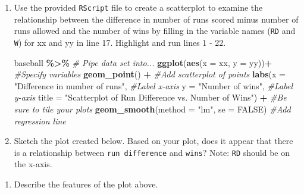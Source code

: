 \documentclass[
]{report}
\newenvironment{Shaded}{\begin{snugshade}}{\end{snugshade}}
\newcommand{\CommentTok}[1]{\textcolor[rgb]{0.56,0.35,0.01}{\textit{#1}}}
\newcommand{\DataTypeTok}[1]{\textcolor[rgb]{0.13,0.29,0.53}{#1}}
\newcommand{\KeywordTok}[1]{\textcolor[rgb]{0.13,0.29,0.53}{\textbf{#1}}}
\newcommand{\NormalTok}[1]{#1}
\newcommand{\OperatorTok}[1]{\textcolor[rgb]{0.81,0.36,0.00}{\textbf{#1}}}
\newcommand{\OtherTok}[1]{\textcolor[rgb]{0.56,0.35,0.01}{#1}}
\newcommand{\StringTok}[1]{\textcolor[rgb]{0.31,0.60,0.02}{#1}}
\providecommand{\tightlist}{%
  \setlength{\itemsep}{0pt}\setlength{\parskip}{0pt}}
\begin{document}
\begin{enumerate}
\def\labelenumi{\arabic{enumi}.}
\setcounter{enumi}{1}
\item
  Use the provided \texttt{RScript} file to create a scatterplot to examine the relationship between the difference in number of runs scored minus number of runs allowed and the number of wins by filling in the variable names (\texttt{RD} and \texttt{W}) for xx and yy in line 17. Highlight and run lines 1 - 22.

\begin{Shaded}
\begin{Highlighting}[]
\NormalTok{baseball }\OperatorTok{\%\textgreater{}\%}\StringTok{ }\CommentTok{\# Pipe data set into...}
\KeywordTok{ggplot}\NormalTok{(}\KeywordTok{aes}\NormalTok{(}\DataTypeTok{x =}\NormalTok{ xx, }\DataTypeTok{y =}\NormalTok{ yy))}\OperatorTok{+}\StringTok{  }\CommentTok{\#Specify variables}
\StringTok{  }\KeywordTok{geom\_point}\NormalTok{() }\OperatorTok{+}\StringTok{  }\CommentTok{\#Add scatterplot of points}
\StringTok{  }\KeywordTok{labs}\NormalTok{(}\DataTypeTok{x =} \StringTok{"Difference in number of runs"}\NormalTok{,  }\CommentTok{\#Label x{-}axis}
       \DataTypeTok{y =} \StringTok{"Number of wins"}\NormalTok{,  }\CommentTok{\#Label y{-}axis}
       \DataTypeTok{title =} \StringTok{"Scatterplot of Run Difference vs. Number of Wins"}\NormalTok{) }\OperatorTok{+}\StringTok{ }\CommentTok{\#Be sure to tile your plots}
\StringTok{  }\KeywordTok{geom\_smooth}\NormalTok{(}\DataTypeTok{method =} \StringTok{"lm"}\NormalTok{, }\DataTypeTok{se =} \OtherTok{FALSE}\NormalTok{)  }\CommentTok{\#Add regression line}
\end{Highlighting}
\end{Shaded}
\item
  Sketch the plot created below. Based on your plot, does it appear that there is a relationship between \texttt{run\ difference} and \texttt{wins}? Note: \texttt{RD} should be on the x-axis.
\end{enumerate}

\vspace{2in}

\begin{enumerate}
\def\labelenumi{\arabic{enumi}.}
\setcounter{enumi}{3}
\tightlist
\item
  Describe the features of the plot above.
\end{enumerate}

\vspace{1in}
\end{document}
